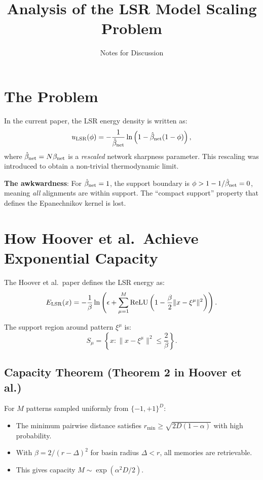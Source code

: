 \documentclass[11pt]{article}
\title{Analysis of the LSR Model Scaling Problem}
\author{Notes for Discussion}
\date{}
\newcommand{\bnet}{\beta_{\rm net}}
\newcommand{\bhat}{\hat{\beta}_{\rm net}}
\begin{document}
\maketitle

\section{The Problem}

In the current paper, the LSR energy density is written as:
\begin{equation}
    u_{\rm LSR}(\phi) = -\frac{1}{\bhat} \ln\left(1 - \bhat(1-\phi)\right),
\end{equation}
where $\bhat = N\bnet$ is a \emph{rescaled} network sharpness parameter. This rescaling was introduced to obtain a non-trivial thermodynamic limit.

\textbf{The awkwardness}: For $\bhat = 1$, the support boundary is $\phi > 1 - 1/\bhat = 0$, meaning \emph{all} alignments are within support. The ``compact support'' property that defines the Epanechnikov kernel is lost.

\section{How Hoover et al.\ Achieve Exponential Capacity}

The Hoover et al.\ paper defines the LSR energy as:
\begin{equation}
    E_{\rm LSR}(x) = -\frac{1}{\beta} \ln\left(\epsilon + \sum_{\mu=1}^M \text{ReLU}\left(1 - \frac{\beta}{2}\|x - \xi^\mu\|^2\right)\right).
\end{equation}

The support region around pattern $\xi^\mu$ is:
\begin{equation}
    S_\mu = \left\{x : \|x - \xi^\mu\|^2 \leq \frac{2}{\beta}\right\}.
\end{equation}

\subsection{Capacity Theorem (Theorem 2 in Hoover et al.)}

For $M$ patterns sampled uniformly from $\{-1,+1\}^D$:
\begin{itemize}
    \item The minimum pairwise distance satisfies $r_{\min} \geq \sqrt{2D(1-\alpha)}$ with high probability.
    \item With $\beta = 2/(r - \Delta)^2$ for basin radius $\Delta < r$, all memories are retrievable.
    \item This gives capacity $M \sim \exp(\alpha^2 D/2)$.
\end{itemize}
\end{document}

